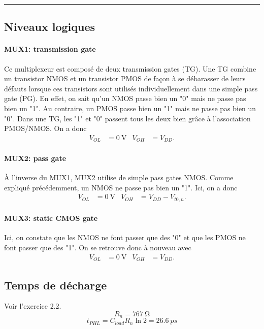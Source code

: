 \documentclass[frenchb,DIV=14]{scrartcl}
\begin{document}
\hspace{1cm}\hrule

\subsection*{Niveaux logiques}
\paragraph{MUX1: transmission gate} 
Ce multiplexeur est composé de deux transmission gates (TG).
Une TG combine un transistor NMOS et un transistor PMOS de façon à se débarasser
de leurs défauts lorsque ces transistors sont utilisés individuellement dans une
simple pass gate (PG). En effet, on sait qu'un NMOS passe bien un "0" mais ne passe
pas bien un "1". Au contraire, un PMOS passe bien un "1" mais ne passe pas bien un "0".
Dans une TG, les "1" et "0" passent tous les deux bien grâce à l'association PMOS/NMOS.
On a donc
\begin{align*}
	V_{OL} &= \SI{0}{\volt} & V_{OH} &= V_{DD}.
\end{align*}

\paragraph{MUX2: pass gate} 
\`{A} l'inverse du MUX1, MUX2 utilise de simple pass gates NMOS.
Comme expliqué précédemment, un NMOS ne passe pas bien un "1". Ici, on a donc
\begin{align*}
	V_{OL} &= \SI{0}{\volt} & V_{OH} &= V_{DD}-V_{t0,n}.
\end{align*}

\paragraph{MUX3: static CMOS gate}
Ici, on constate que les NMOS ne font passer que des "0" et que les PMOS ne
font passer que des "1". On se retrouve donc à nouveau avec
\begin{align*}
	V_{OL} &= \SI{0}{\volt} & V_{OH} &= V_{DD}.
\end{align*}

\subsection*{Temps de décharge}
Voir l'exercice 2.2.
\[R_n = \SI{767}{\ohm}\]
\[t_{PHL} = C_{load}R_n\ln2 = \SI{26.6}{ps}\]
\end{document}
